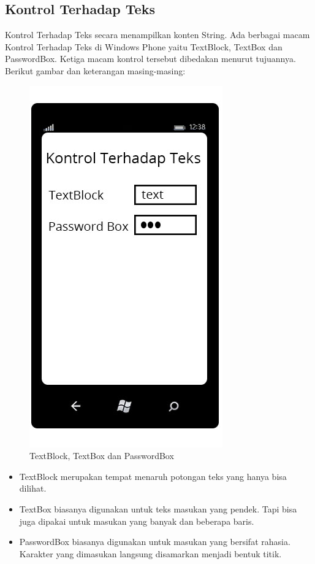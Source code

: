 \subsection{Kontrol Terhadap Teks}
\label{subsec:Kontrol Terhadap Teks}
\hspace{0.5cm} Kontrol Terhadap Teks  secara menampilkan konten String. Ada berbagai macam Kontrol Terhadap Teks di Windows Phone yaitu TextBlock, TextBox dan PasswordBox. Ketiga macam kontrol tersebut dibedakan menurut tujuannya. Berikut gambar dan keterangan masing-masing:
\begin{figure}[h]
	\centering
		\includegraphics[scale=0.5]{Gambar/Tombol/kontrol_teks}
	\caption{TextBlock, TextBox dan PasswordBox}
	\label{fig:kontrol_teks}
\end{figure}

\begin{itemize}
	\item TextBlock merupakan tempat menaruh potongan teks yang hanya bisa dilihat.
	\item TextBox biasanya digunakan untuk teks masukan yang pendek. Tapi bisa juga dipakai untuk masukan yang banyak dan beberapa baris.
	\item PasswordBox biasanya digunakan untuk masukan yang bersifat rahasia. Karakter yang dimasukan langsung disamarkan menjadi bentuk titik.
\end{itemize}

